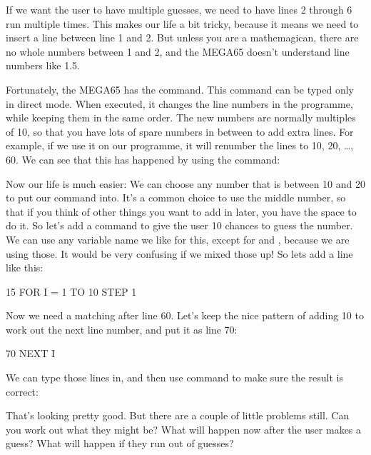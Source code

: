 If we want the user to have multiple guesses, we need to have lines 2
through 6 run multiple times.  This makes our life a bit tricky,
because it means we need to insert a line between line 1 and 2. But
unless you are a mathemagican, there are no whole numbers between 1
and 2, and the MEGA65 doesn't understand line numbers like 1.5.

\needspace{4cm}
Fortunately, the MEGA65 has the
command.  This command can be typed only in direct mode. When
executed, it changes the line numbers in the programme, while keeping
them in the same order.  The new numbers are normally multiples of 10,
so that you have lots of spare numbers in between to add extra lines.
For example, if we use it on our programme, it will renumber the lines
to 10, 20, \ldots, 60. We can see that this has happened by using the
 command:


\needspace{3cm}
Now our life is much easier: We can choose any  number that is between
10 and 20 to put our  command into.  It's a common choice to
use the middle number, so that if you think of other things you want
to add in later, you have the space to do it.  So let's add a
 command to give the user 10 chances to guess the number.  We
can use any variable name we like for this, except for  and
, because we are using those. It would be very confusing if we
mixed those up!  So lets add a line like this:

\begin{screentext}
15 FOR I = 1 TO 10 STEP 1
\end {screentext}

\needspace{3cm}
Now we need a matching  after line 60.  Let's keep the
nice pattern of adding 10 to work out the next line number, and put it
as line 70:

\begin{screentext}
70 NEXT I
\end{screentext}

\needspace{4cm}
We can type those lines in, and then use  command to make
sure the result is correct:


That's looking pretty good.  But there are a couple of little problems still.
Can you work out what they might be? What will happen now after the user makes a guess?
What will happen if they run out of guesses?


